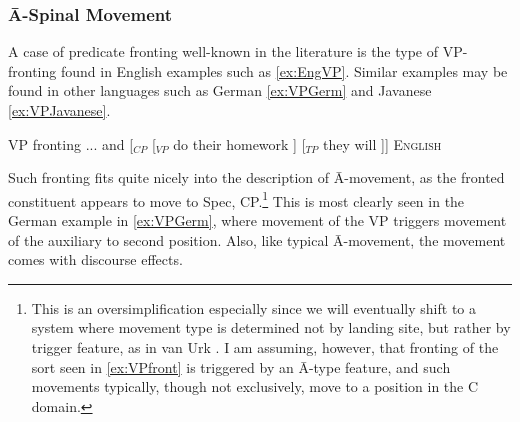 \documentclass[output=paper,colorlinks,citecolor=brown,
]{langscibook}
\begin{document}
\subsubsection{\=A-Spinal Movement}

A case of predicate fronting well-known in the literature is the type of VP-fronting found in English examples such as \ref{ex:EngVP}.  Similar examples may be found in other languages such as German \ref{ex:VPGerm} and Javanese \ref{ex:VPJavanese}.

\ea VP fronting \label{ex:VPfront}
    \ea  ... and {[}$_{CP}$ {[}$_{VP}$ do their homework ] {[}$_{TP}$ they will \underline{\hspace{.5cm}} {]]} \hfill \textsc{English}\label{ex:EngVP}\\
	\z
{}
\z

Such fronting fits quite nicely into the description of \=A-movement, as the fronted constituent appears to move to Spec, CP.\footnote{This is an oversimplification especially since we will eventually shift to a system where movement type is determined not by landing site, but rather by trigger feature, as in van Urk \citeyearpar{vanUrk:2015a}. I am assuming, however, that fronting of the sort seen in \ref{ex:VPfront} is triggered by an \=A-type feature, and such movements typically, though not exclusively, move to a position in the C domain.}  This is most clearly seen in the German example in  \ref{ex:VPGerm}, where movement of the VP triggers movement of the auxiliary to second position.  Also, like typical \=A-movement, the movement comes with discourse effects.

\end{document}
